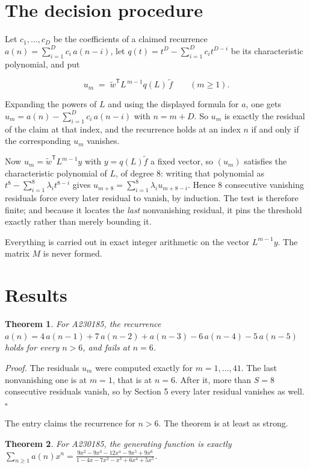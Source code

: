 \documentclass[11pt]{article}
\newtheorem{theorem}{Theorem}
\theoremstyle{definition}
\begin{document}
\section{The decision procedure}

Let $c_1,\dots,c_D$ be the coefficients of a claimed recurrence $a(n) = \sum_{i=1}^{D} c_i\,a(n-i)$, let $q(t) = t^{D} - \sum_{i=1}^{D} c_i t^{D-i}$ be its characteristic polynomial, and put

\[u_m \;=\; \tilde w^{\mathsf T} L^{\,m-1} q(L)\,\tilde f \qquad (m \ge 1).\]

Expanding the powers of $L$ and using the displayed formula for $a$, one gets $u_m = a(n) - \sum_{i=1}^{D} c_i\,a(n-i)$ with $n = m + D$. So $u_m$ is exactly the residual of the claim at that index, and the recurrence holds at an index $n$ if and only if the corresponding $u_m$ vanishes.

Now $u_m = \tilde w^{\mathsf T} L^{m-1} y$ with $y = q(L)\tilde f$ a fixed vector, so $(u_m)$ satisfies the characteristic polynomial of $L$, of degree $8$: writing that polynomial as $t^{8} - \sum_{i=1}^{8} \lambda_i t^{8-i}$ gives $u_{m+8} = \sum_{i=1}^{8} \lambda_i u_{m+8-i}$. Hence $8$ consecutive vanishing residuals force every later residual to vanish, by induction. The test is therefore finite; and because it locates the {\itshape last} nonvanishing residual, it pins the threshold exactly rather than merely bounding it.

Everything is carried out in exact integer arithmetic on the vector $L^{m-1}y$. The matrix $M$ is never formed.

\section{Results}

\begin{theorem} For A230185, the recurrence $a(n) = 4\,a(n-1) + 7\,a(n-2) + a(n-3) - 6\,a(n-4) - 5\,a(n-5)$ holds for every $n > 6$, and fails at $n = 6$.\end{theorem}

{\itshape Proof.} The residuals $u_m$ were computed exactly for $m = 1,\dots,41$. The last nonvanishing one is at $m = 1$, that is at $n = 6$. After it, more than $S = 8$ consecutive residuals vanish, so by Section 5 every later residual vanishes as well. $\square$

The entry claims the recurrence for $n > 6$. The theorem is at least as strong.

\begin{theorem} For A230185, the generating function is exactly $\sum_{n\ge 1} a(n)x^n = \frac{9x^{2} - 9x^{3} - 12x^{4} - 9x^{5} + 9x^{6}}{1 - 4x - 7x^{2} - x^{3} + 6x^{4} + 5x^{5}}$.\end{theorem}
\end{document}
